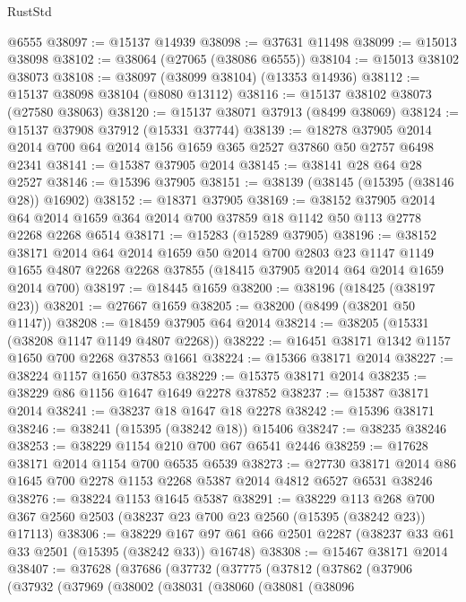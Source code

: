 \begin{lexlean}{RustStd}
\begin{coremodule}
    @6555
@38097 := @15137 @14939
@38098 := @37631 @11498
@38099 := @15013 @38098
@38102 := @38064 (@27065 (@38086 @6555))
@38104 := @15013 @38102 @38073
@38108 := @38097 (@38099 @38104) (@13353 @14936)
@38112 := @15137 @38098 @38104 (@8080 @13112)
@38116 := @15137 @38102 @38073 (@27580 @38063)
@38120 := @15137 @38071 @37913 (@8499 @38069)
@38124 := @15137 @37908 @37912 (@15331 @37744)
@38139 := @18278
    @37905
    @2014
    @2014
    @700
    @64
    @2014
    @156
    @1659
    @365
    @2527
    @37860
    @50
    @2757
    @6498
    @2341
@38141 := @15387 @37905 @2014
@38145 := @38141 @28 @64 @28 @2527
@38146 := @15396 @37905
@38151 := @38139 (@38145 (@15395 (@38146 @28)) @16902)
@38152 := @18371 @37905
@38169 := @38152
    @37905
    @2014
    @64
    @2014
    @1659
    @364
    @2014
    @700
    @37859
    @18
    @1142
    @50
    @113
    @2778
    @2268
    @2268
    @6514
@38171 := @15283 (@15289 @37905)
@38196 := @38152
    @38171
    @2014
    @64
    @2014
    @1659
    @50
    @2014
    @700
    @2803
    @23
    @1147
    @1149
    @1655
    @4807
    @2268
    @2268
    @37855
    (@18415 @37905 @2014 @64 @2014 @1659 @2014 @700)
@38197 := @18445 @1659
@38200 := @38196 (@18425 (@38197 @23))
@38201 := @27667 @1659
@38205 := @38200 (@8499 (@38201 @50 @1147))
@38208 := @18459 @37905 @64 @2014
@38214 := @38205 (@15331 (@38208 @1147 @1149 @4807 @2268))
@38222 := @16451 @38171 @1342 @1157 @1650 @700 @2268 @37853 @1661
@38224 := @15366 @38171 @2014
@38227 := @38224 @1157 @1650 @37853
@38229 := @15375 @38171 @2014
@38235 := @38229 @86 @1156 @1647 @1649 @2278 @37852
@38237 := @15387 @38171 @2014
@38241 := @38237 @18 @1647 @18 @2278
@38242 := @15396 @38171
@38246 := @38241 (@15395 (@38242 @18)) @15406
@38247 := @38235 @38246
@38253 := @38229 @1154 @210 @700 @67 @6541 @2446
@38259 := @17628 @38171 @2014 @1154 @700 @6535 @6539
@38273 := @27730 @38171 @2014 @86 @1645 @700 @2278 @1153 @2268 @5387 @2014 @4812 @6527 @6531 @38246
@38276 := @38224 @1153 @1645 @5387
@38291 := @38229
    @113
    @268
    @700
    @367
    @2560
    @2503
    (@38237 @23 @700 @23 @2560 (@15395 (@38242 @23)) @17113)
@38306 := @38229
    @167
    @97
    @61
    @66
    @2501
    @2287
    (@38237 @33 @61 @33 @2501 (@15395 (@38242 @33)) @16748)
@38308 := @15467 @38171 @2014
@38407 := @37628
    (@37686
      (@37732
        (@37775
          (@37812
            (@37862
              (@37906
                (@37932
                  (@37969
                    (@38002
                      (@38031
                        (@38060
                          (@38081
                            (@38096

\end{coremodule}
\end{lexlean}
